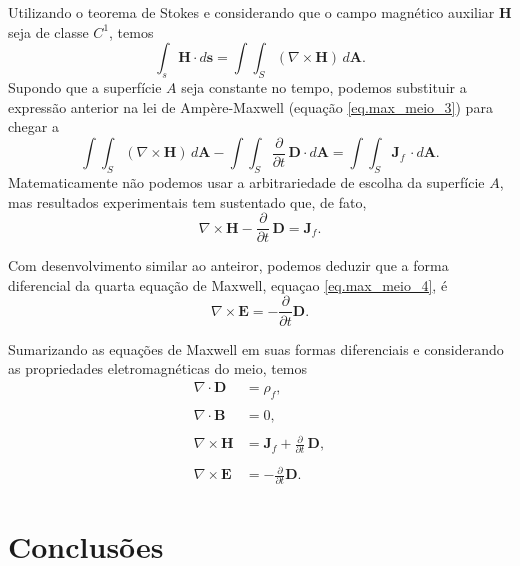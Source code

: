 Utilizando o teorema de Stokes e considerando que o campo  magn\'etico auxiliar $\mathbf{H}$ seja de classe $C^1$, temos
\begin{equation*}
\int_s\mathbf{H}\cdot d\mathbf{s}=\int\int_S(\nabla\times\mathbf{H})\,d\mathbf{A}.
\end{equation*}
Supondo que a superf\'icie $A$ seja constante no tempo, podemos substituir a express\~ao anterior na lei de Amp\`ere-Maxwell (equa\c{c}\~ao \ref{eq.max_meio_3}) para chegar a
\begin{equation*}
\int\int_S(\nabla\times\mathbf{H})\,d\mathbf{A}-\int\int_S\frac{\partial}{\partial t}\,\mathbf{D}\cdot d\mathbf{A}=\int\int_S\mathbf{J}_f\,\cdot d\mathbf{A}.
\end{equation*}
Matematicamente n\~ao podemos usar a arbitrariedade de escolha da superf\'icie $A$, mas resultados experimentais tem sustentado que, de fato,
\begin{equation*}
\nabla\times\mathbf{H}-\frac{\partial}{\partial t}\,\mathbf{D}=\mathbf{J}_f.
\end{equation*}

Com desenvolvimento similar ao anteiror, podemos deduzir que a forma diferencial da quarta equa\c{c}\~ao de Maxwell, equa\c{c}ao \ref{eq.max_meio_4}, \'e
\begin{equation*}
\nabla\times\mathbf{E}=-\frac{\partial}{\partial t}\mathbf{D}.
\end{equation*}

Sumarizando as equa\c{c}\~oes de Maxwell em suas formas diferenciais e considerando as propriedades eletromagn\'eticas do meio, temos
\begin{align}
\nabla\cdot\mathbf{D}&=\rho_f,\\\nonumber\\
\nabla\cdot\mathbf{B}&=0,\\\nonumber\\
\nabla\times\mathbf{H}&=\mathbf{J}_f+\frac{\partial}{\partial t}\,\mathbf{D},\\\nonumber\\
\nabla\times\mathbf{E}&=-\frac{\partial}{\partial t}\mathbf{D}.
\end{align} 






\section{Conclusões}
